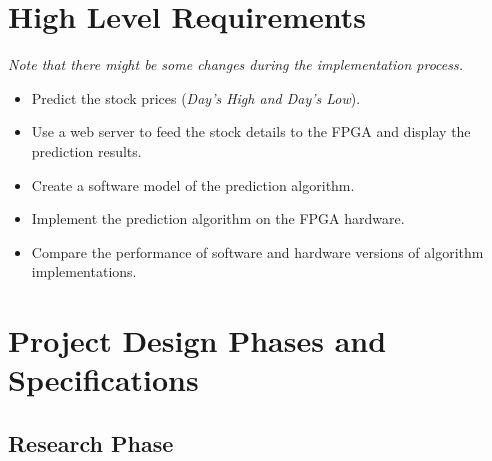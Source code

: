 \documentclass{sig-alternate}
\begin{document}
   \section{High Level Requirements}
	   \textit {Note that there might be some changes during the implementation process.}
	   \begin{itemize}
	   	\item  Predict the stock prices (\textit{Day's High and Day's Low}).
	   	\item  Use a web server to feed the stock details to the FPGA and display the prediction results.
	   	\item Create a software model of the prediction algorithm. 
	   	\item Implement the prediction algorithm on the FPGA hardware.
	   	\item Compare the performance of software and hardware versions of algorithm implementations. 
	   	\end{itemize}
   \section {Project Design Phases and Specifications}
     \subsection{Research Phase}
\end{document}
